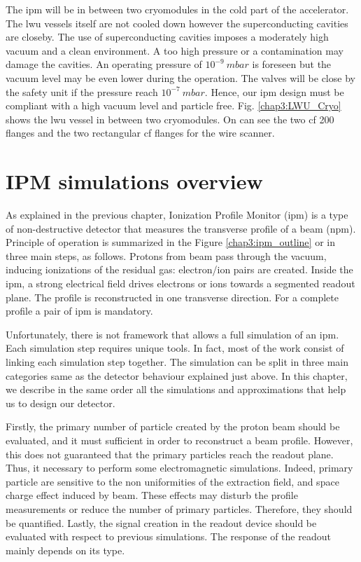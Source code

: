 \begin{refsection}
	The \acrshort{ipm} will be in between two cryomodules in the cold part of the accelerator. The \acrshort{lwu} vessels itself are not cooled down however the superconducting cavities are closeby. The use of superconducting cavities imposes a moderately high vacuum and a clean environment. A too high pressure or a contamination may damage the cavities. An operating pressure of \(10^{-9}\ mbar\) is foreseen but the vacuum level may be even lower during the operation. The valves will be close by the safety unit if the pressure reach \(10^{-7}\ mbar\). Hence, our \acrshort{ipm} design must be compliant with a high vacuum level and particle free. Fig. \ref{chap3:LWU_Cryo} shows the \acrshort{lwu} vessel in between two cryomodules. On can see the two \acrshort{cf} 200 flanges and the two rectangular \acrshort{cf} flanges for the wire scanner.

	

	\section{IPM simulations overview}
	As explained in the previous chapter, Ionization Profile Monitor (\acrshort{ipm}) is a type of non-destructive detector that measures the transverse profile of a beam (\acrshort{npm}).
	Principle of operation is summarized in the Figure \ref{chap3:ipm_outline} or in three main steps, as follows.
	Protons from beam pass through the vacuum, inducing ionizations of the residual gas: electron/ion pairs are created.
	Inside the \acrshort{ipm}, a strong electrical field drives electrons or ions towards a segmented readout plane.
	The profile is reconstructed in one transverse direction. For a complete profile a pair of \acrshort{ipm} is mandatory.

	

	Unfortunately, there is not framework that allows a full simulation of an \acrshort{ipm}. Each simulation step requires unique tools. In fact, most of the work consist of linking each simulation step together. The simulation can be split in three main categories same as the detector behaviour explained just above. In this chapter, we describe in the same order all the simulations and approximations that help us to design our detector.

	Firstly, the primary number of particle created by the proton beam should be evaluated, and it must sufficient in order to reconstruct a beam profile. However, this does not guaranteed that the primary particles reach the readout plane. Thus, it necessary to perform some electromagnetic simulations. Indeed, primary particle are sensitive to the non uniformities of the extraction field, and space charge effect induced by beam. These effects may disturb the profile measurements or reduce the number of primary particles. Therefore, they should be quantified. Lastly, the signal creation in the readout device should be evaluated with respect to previous simulations. The response of the readout mainly depends on its type.


\end{refsection}
